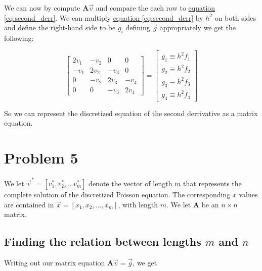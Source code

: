 \documentclass[english,notitlepage]{article}  %
\begin{document}
    We can now by compute $\boldsymbol{A}\vec{v}$ and compare the each row to \hyperref[eq:second_derr]{equation \ref*{eq:second_derr}}. We can multiply \hyperref[eq:second_derr]{equation \ref*{eq:second_derr}} by $h^2$ on both sides and define the right-hand side to be $g_i$ defining $\vec{g}$ appropriately we get the following:

    \begin{equation}\label{eq:mat_Vhf}
        \begin{bmatrix}
            2v_1 & -v_2 & 0 & 0 \\
            -v_1 & 2v_2 & -v_3 & 0 \\
            0 & -v_2 & 2v_3 & -v_4 \\
            0 & 0 & -v_3 & 2v_4
        \end{bmatrix} = \begin{bmatrix}
            g_1 \equiv h^2 f_1\\
            g_2 \equiv h^2 f_2\\
            g_3 \equiv h^2 f_3\\
            g_4 \equiv h^2 f_4
        \end{bmatrix}
    \end{equation}

    So we can represent the discretized equation of the second derrivative as a matrix equation.

\section*{Problem 5}

  We let $\vec{v}^* = [v^*_1, v^*_2, ... v^*_m]$ denote the vector of length $m$ that represents the complete solution of the discretized Poisson equation. The corresponding $x$ values are contained in $\vec{x} = [x_1, x_2, ..., x_m]$, with length $m$. We let \textbf{A} be an $n \times n$ matrix.

  \subsection*{Finding the relation between lengths $m$ and $n$}

    Writing out our matrix equation $\boldsymbol{A} \vec{v} = \vec{g}$, we get
\end{document}
